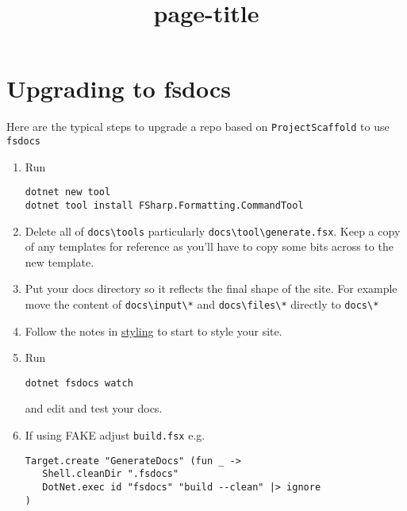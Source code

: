 \documentclass{article}
\title{{page-title}}
\date{}
\begin{document}
\maketitle


\section*{Upgrading to fsdocs}



Here are the typical steps to upgrade a repo based on \texttt{ProjectScaffold} to use \texttt{fsdocs}
\begin{enumerate}
\item 

Run
\begin{lstlisting}
dotnet new tool
dotnet tool install FSharp.Formatting.CommandTool

\end{lstlisting}

\item 

Delete all of \texttt{docs{\textbackslash}tools} particularly \texttt{docs{\textbackslash}tool{\textbackslash}generate.fsx}.  Keep a copy of any templates for reference as you'll have to copy some bits across to the new template.

\item 

Put your docs directory so it reflects the final shape of the site. For example move the content of \texttt{docs{\textbackslash}input{\textbackslash}*} and \texttt{docs{\textbackslash}files{\textbackslash}*} directly to \texttt{docs{\textbackslash}*}

\item 

Follow the notes in \href{styling.html}{styling} to start to style your site.

\item 

Run
\begin{lstlisting}
dotnet fsdocs watch

\end{lstlisting}


and edit and test your docs.

\item 

If using FAKE adjust \texttt{build.fsx} e.g.
\begin{lstlisting}
Target.create "GenerateDocs" (fun _ ->
   Shell.cleanDir ".fsdocs"
   DotNet.exec id "fsdocs" "build --clean" |> ignore
)


\end{lstlisting}
\end{enumerate}
\end{document}
